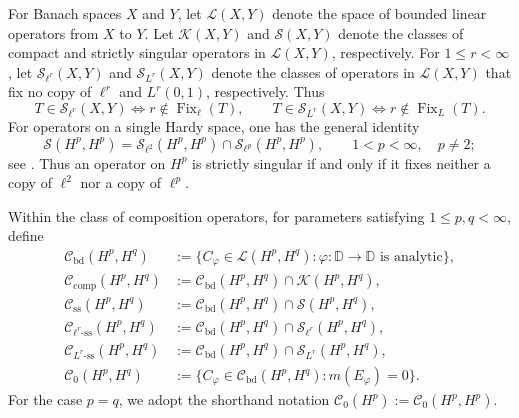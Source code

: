 \documentclass[10pt,a4paper]{amsart}
\newcommand{\D}{\mathbb{D}}
\newcommand{\CB}{\mathcal C_{\mathrm{bd}}}
\newcommand{\CK}{\mathcal C_{\mathrm{comp}}}
\newcommand{\CS}{\mathcal C_{\mathrm{ss}}}
\newcommand{\CSell}[1]{\mathcal C_{\ell^{#1}\text{-ss}}}
\newcommand{\CSL}[1]{\mathcal C_{L^{#1}\text{-ss}}}
\begin{document}
For Banach spaces \(X\) and \(Y\), let \(\mathcal L(X,Y)\) denote the
space of bounded linear operators from \(X\) to \(Y\). Let
\(\mathcal K(X,Y)\) and \(\mathcal S(X,Y)\) denote the classes of
compact and strictly singular operators in \(\mathcal L(X,Y)\),
respectively. For \(1\le r<\infty\), let
\(\mathcal S_{\ell^r}(X,Y)\) and \(\mathcal S_{L^r}(X,Y)\) denote the
classes of operators in \(\mathcal L(X,Y)\) that fix no copy of
\(\ell^r\) and \(L^r(0,1)\), respectively. Thus
\[
T\in\mathcal S_{\ell^r}(X,Y)
\Longleftrightarrow
r\notin\operatorname{Fix}_{\ell}(T),
\qquad
T\in\mathcal S_{L^r}(X,Y)
\Longleftrightarrow
r\notin\operatorname{Fix}_{L}(T).
\]
For operators on a single Hardy space, one has the general identity
\[
        \mathcal S(H^p,H^p)
        =
        \mathcal S_{\ell^2}(H^p,H^p)
        \cap
        \mathcal S_{\ell^p}(H^p,H^p),
        \qquad
        1<p<\infty,\quad p\ne2;
\]
see \cite[(1.4)]{LNST2017}. Thus an operator on \(H^p\) is strictly
singular if and only if it fixes neither a copy of \(\ell^2\) nor a
copy of \(\ell^p\).

Within the class of composition operators, for parameters satisfying \(1\le p,q<\infty\), define
  \[
\begin{aligned}
\CB(H^p,H^q)
&:=
\bigl\{
C_\varphi\in\mathcal L(H^p,H^q):
\varphi:\D\to\D\text{ is analytic}
\bigr\},\\
\CK(H^p,H^q)
&:=
\CB(H^p,H^q)\cap\mathcal K(H^p,H^q),\\
\CS(H^p,H^q)
&:=
\CB(H^p,H^q)\cap\mathcal S(H^p,H^q),\\
\CSell{r}(H^p,H^q)
&:=
\CB(H^p,H^q)\cap\mathcal S_{\ell^r}(H^p,H^q),\\
\CSL{r}(H^p,H^q)
&:=
\CB(H^p,H^q)\cap\mathcal S_{L^r}(H^p,H^q),\\
\mathcal C_0(H^p,H^q)
&:=
\bigl\{
C_\varphi\in\CB(H^p,H^q):
m(E_\varphi)=0
\bigr\}.
\end{aligned}
\]
For the case \(p=q\), we adopt the shorthand notation
 \(
\mathcal C_0(H^p):=\mathcal C_0(H^p,H^p).
\)

 
\end{document}
